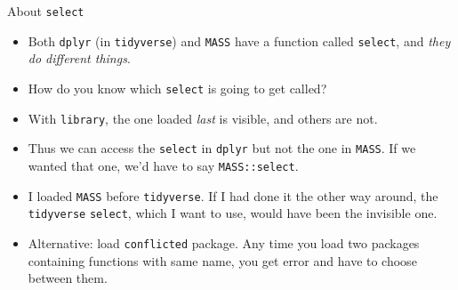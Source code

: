\documentclass[ignorenonframetext,]{beamer}
\begin{document}
\begin{frame}[fragile]{About \texttt{select}}
\protect\hypertarget{about-select}{}

\begin{itemize}
\item
  Both \texttt{dplyr} (in \texttt{tidyverse}) and \texttt{MASS} have a
  function called \texttt{select}, and \emph{they do
  different things}.
\item
  How do you know which \texttt{select} is going to get called?
\item
  With \texttt{library}, the one loaded \emph{last} is visible, and
  others are not.
\item
  Thus we can access the \texttt{select} in \texttt{dplyr} but not the
  one in \texttt{MASS}. If we wanted that one, we'd have to say
  \texttt{MASS::select}.
\item
  I loaded \texttt{MASS} before \texttt{tidyverse}. If I had done it the
  other way around, the \texttt{tidyverse} \texttt{select}, which I want
  to use, would have been the invisible one.
\item
  Alternative: load \texttt{conflicted} package. Any time you load two
  packages containing functions with same name, you get error and have
  to choose between them.
\end{itemize}

\end{frame}
\end{document}
